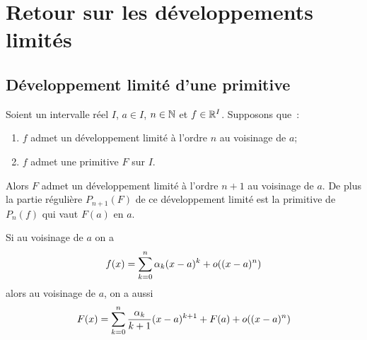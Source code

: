 \section{Retour sur les développements limités}

\subsection{Développement limité d'une primitive}

\begin{theo}
  Soient un intervalle réel \(I\), \(a \in I\), \(n \in \mathbb{N}\) et \(f \in \mathbb{R}^I\). 
  Supposons que~:
  \begin{enumerate}
    \item \(f\) admet un développement limité à l'ordre \(n\) au voisinage de 
      \(a\);
    \item \(f\) admet une primitive \(F\) sur \(I\).
  \end{enumerate}
  Alors \(F\) admet un développement limité à l'ordre \(n+1\) au voisinage de 
  \(a\). De plus la partie régulière \(P_{n+1}(F)\) de ce développement limité 
  est la primitive de \(P_n(f)\) qui vaut \(F(a)\) en \(a\).

  Si au voisinage de \(a\) on a
  \begin{equation}
    f(x) = \sum_{k = 0}^n \alpha_k(x-a)^k +o\mathopen{}\left((x-a)^n\right)
  \end{equation}
  alors au voisinage de \(a\), on a aussi
  \begin{equation}
    F(x) = \sum_{k = 0}^n \frac{\alpha_k}{k+1}(x-a)^{k+1} +F(a) + o\mathopen{}\left((x-a)^n\right)
  \end{equation}
\end{theo}
